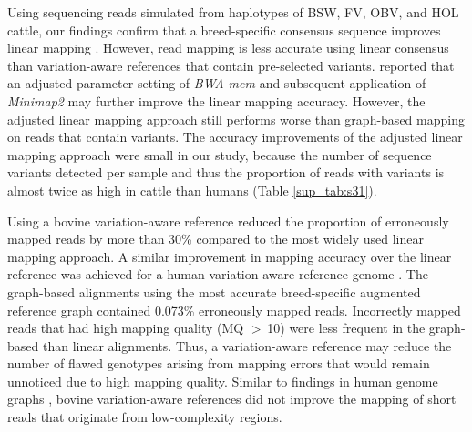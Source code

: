 \documentclass[../main.tex]{subfiles}
\begin{document}
Using sequencing reads simulated from haplotypes of BSW, FV, OBV, and HOL cattle, our findings confirm that a breed-specific consensus sequence improves linear mapping \citep{ballouz2019time,shukla2019hg19kindel}. However, read mapping is less accurate using linear consensus than variation-aware references that contain pre-selected variants. \citet{grytten2020assessing} reported that an adjusted parameter setting of \emph{BWA mem} and subsequent application of \emph{Minimap2} may further improve the linear mapping accuracy. However, the adjusted linear mapping approach still performs worse than graph-based mapping on reads that contain variants. The accuracy improvements of the adjusted linear mapping approach were small in our study, because the number of sequence variants detected per sample and thus the proportion of reads with variants is almost twice as high in cattle than humans (Table \ref{sup_tab:s31}).

Using a bovine variation-aware reference reduced the proportion of erroneously mapped reads by more than 30\% compared to the most widely used linear mapping approach. A similar improvement in mapping accuracy over the linear reference was achieved for a human variation-aware reference genome \citep{pritt2018forge}. The graph-based alignments using the most accurate breed-specific augmented reference graph contained 0.073\% erroneously mapped reads. Incorrectly mapped reads that had high mapping quality (MQ $>$ 10) were less frequent in the graph-based than linear alignments. Thus, a variation-aware reference may reduce the number of flawed genotypes arising from mapping errors that would remain unnoticed due to high mapping quality. Similar to findings in human genome graphs \citep{pritt2018forge,hickey2020genotyping}, bovine variation-aware references did not improve the mapping of short reads that originate from low-complexity regions.
\end{document}
